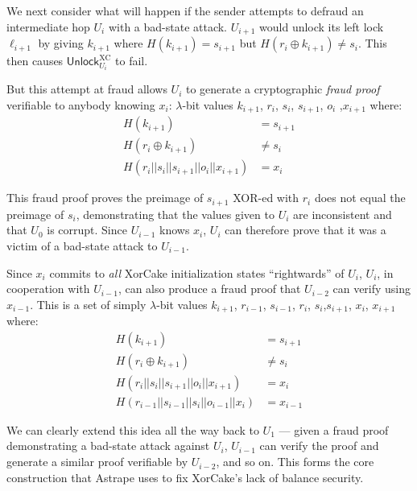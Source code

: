 \documentclass[USenglish,oneside,twocolumn]{article}
\begin{document}
We next consider what will happen if the sender attempts to defraud an intermediate hop $U_i$ with a bad-state attack. $U_{i+1}$ would unlock its left lock $\ell_{i+1}$ by giving $k_{i+1}$ where $H(k_{i+1})= s_{i+1}$ but $H(r_i\oplus k_{i+1})\neq s_i$. This then causes $\mathsf{Unlock}^\mathrm{XC}_{U_i}$ to fail.

But this attempt at fraud allows $U_i$ to generate a cryptographic \emph{fraud proof} verifiable to anybody knowing $x_i$: $\lambda$-bit values $k_{i+1}$, $r_i$, $s_i$, $s_{i+1}$, $o_i$ ,$x_{i+1}$ where:
\begin{align*}
    H(k_{i+1})                         & = s_{i+1} \\
    H(r_i \oplus k_{i+1})              & \neq s_i  \\
    H(r_i||s_i||s_{i+1}||o_i||x_{i+1}) & = x_i
\end{align*}

This fraud proof proves the preimage of $s_{i+1}$ XOR-ed with $r_i$ does not equal the preimage of $s_i$, demonstrating that the values given to $U_i$ are inconsistent and that $U_0$ is corrupt. Since $U_{i-1}$ knows $x_i$, $U_i$ can therefore prove that it was a victim of a bad-state attack to $U_{i-1}$.

Since $x_i$ commits to \emph{all} XorCake initialization states ``rightwards'' of $U_i$, $U_i$, in cooperation with $U_{i-1}$, can also produce a fraud proof that $U_{i-2}$ can verify using $x_{i-1}$. This is a set of simply $\lambda$-bit values $k_{i+1}$, $r_{i-1}$, $s_{i-1}$, $r_i$, $s_i$,$s_{i+1}$, $x_i$, $x_{i+1}$ where:
\begin{align*}
    H(k_{i+1})                               & = s_{i+1} \\
    H(r_i \oplus k_{i+1})                    & \neq s_i  \\
    H(r_i||s_i||s_{i+1}||o_i||x_{i+1})       & = x_i     \\
    H(r_{i-1}||s_{i-1}||s_{i}||o_{i-1}||x_i) & = x_{i-1}
\end{align*}

We can clearly extend this idea all the way back to $U_1$ --- given a fraud proof demonstrating a bad-state attack against $U_i$, $U_{i-1}$ can verify the proof and generate a similar proof verifiable by $U_{i-2}$, and so on. This forms the core construction that Astrape uses to fix XorCake's lack of balance security.
\end{document}
